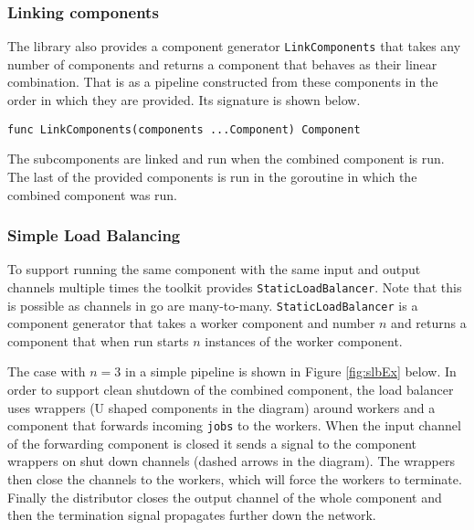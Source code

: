 \subsubsection{Linking components}
The library also provides a component generator \texttt{LinkComponents} that takes 
any number of components and returns a component that behaves as their 
linear combination. That is as a pipeline constructed from these components 
in the order in which they are provided. Its signature is shown below.
\begin{lstlisting}
func LinkComponents(components ...Component) Component
\end{lstlisting}
The subcomponents are linked and run when the combined component is run. 
The last of the provided components is run in the goroutine in which
the combined component was run.

\subsubsection{Simple Load Balancing}
To support running the same component with the same input and output 
channels multiple times the toolkit provides \texttt{StaticLoadBalancer}.
Note that this is possible as channels in go are many-to-many.
\texttt{StaticLoadBalancer} is a component generator that takes a worker 
component and number $n$ and returns a component that when run starts 
$n$ instances of the worker component. 

The case with $n=3$ in a simple pipeline is shown in Figure \ref{fig:slbEx} below. 
In order to support clean shutdown of the combined component, the load balancer uses 
wrappers (U shaped components in the diagram) around workers and a component that 
forwards incoming \texttt{jobs} to the workers. When the input channel of the 
forwarding
component is closed it sends a signal to the component wrappers on shut 
down channels (dashed arrows in the diagram). The wrappers then close
the channels to the workers, which will force the workers to terminate.
Finally the distributor closes the output channel of the whole component
and then the termination signal propagates further down the network.

